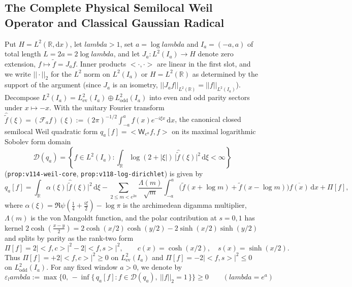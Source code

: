 \documentclass[11pt]{article}
\def\lambda{lambda}%
\def\norm#1{||#1||}%
\def\ip#1#2{<#1,#2>}%
\theoremstyle{remark}
\newcommand{\norm}[1]{\left\lVert #1\right\rVert}
\newcommand{\ip}[2]{\left\langle #1,#2\right\rangle}
\newcommand{\dd}{\mathrm d}
\begin{document}
\subsection{The Complete Physical Semilocal Weil Operator and Classical Gaussian Radical}
Put $H = L^2(\mathbb{R},\dd x)$, let $\lambda > 1$, set $a = \log\lambda$ and $I_a = (-a,a)$ of total length $L = 2a = 2\log\lambda$, and let $J_a : L^2(I_a) \to H$ denote zero extension, $f \mapsto \widetilde{f} = J_a f$. Inner products $\ip{\cdot}{\cdot}$ are linear in the first slot, and we write $\norm{\cdot}_2$ for the $L^2$ norm on $L^2(I_a)$ or $H = L^2(\mathbb{R})$ as determined by the support of the argument (since $J_a$ is an isometry, $\norm{J_a f}_{L^2(\mathbb{R})} = \norm{f}_{L^2(I_a)}$). Decompose $L^2(I_a) = L^2_{\mathrm{ev}}(I_a) \oplus L^2_{\mathrm{odd}}(I_a)$ into even and odd parity sectors under $x \mapsto -x$. With the unitary Fourier transform $\widehat{\widetilde{f}}(\xi) = (\mathcal{F}_a f)(\xi) := (2\pi)^{-1/2}\int_{-a}^a f(x)e^{-i\xi x}\,\dd x$, the canonical closed semilocal Weil quadratic form $q_a[f] = \ip{\mathsf{W}_{e^a}f}{f}$ on its maximal logarithmic Sobolev form domain
\[
  \mathcal{D}(q_a) = \left\{f \in L^2(I_a) : \int_{\mathbb{R}} \log(2 + |\xi|)\,\bigl|\widehat{\widetilde{f}}(\xi)\bigr|^2\,\dd\xi < \infty\right\}
\]
(\texttt{prop:v114-weil-core}, \texttt{prop:v118-log-dirichlet}) is given by
\begin{equation}\label{eq:weil-form}
  q_a[f] = \int_{\mathbb{R}} \alpha(\xi)\bigl|\widehat{\widetilde{f}}(\xi)\bigr|^2\,\dd\xi - \sum_{2 \le m < e^{2a}} \frac{\Lambda(m)}{\sqrt{m}} \int_{-a}^a \bigl(\widetilde{f}(x + \log m) + \widetilde{f}(x - \log m)\bigr)\overline{f(x)}\,\dd x + \Pi[f],
\end{equation}
where $\alpha(\xi) = \Re\psi\!\left(\tfrac{1}{4} + \tfrac{i\xi}{2}\right) - \log\pi$ is the archimedean digamma multiplier, $\Lambda(m)$ is the von Mangoldt function, and the polar contribution at $s = 0, 1$ has kernel $2\cosh(\frac{x-y}{2}) = 2\cosh(x/2)\cosh(y/2) - 2\sinh(x/2)\sinh(y/2)$ and splits by parity as the rank-two form
\begin{equation}\label{eq:pole-form}
  \Pi[f] = 2\bigl|\ip{f}{c}\bigr|^2 - 2\bigl|\ip{f}{s}\bigr|^2, \qquad c(x) = \cosh(x/2), \quad s(x) = \sinh(x/2).
\end{equation}
Thus $\Pi[f] = +2|\ip{f}{c}|^2 \ge 0$ on $L^2_{\mathrm{ev}}(I_a)$ and $\Pi[f] = -2|\ip{f}{s}|^2 \le 0$ on $L^2_{\mathrm{odd}}(I_a)$. For any fixed window $a > 0$, we denote by
\begin{equation}\label{eq:eps-lambda-def}
  \varepsilon_\lambda := \max\bigl\{0,\, -\inf\{\,q_a[f] : f \in \mathcal{D}(q_a),\ \norm{f}_2 = 1\,\}\bigr\} \ge 0 \qquad (\lambda = e^a)
\end{equation}
\end{document}
